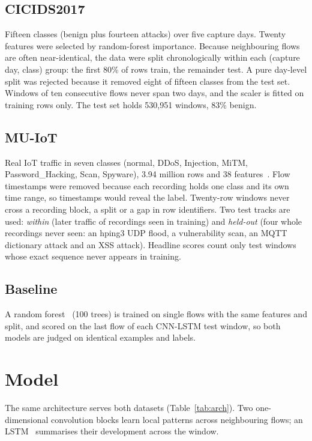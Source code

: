 \documentclass[conference]{IEEEtran}
\begin{document}
\subsection{CICIDS2017}
Fifteen classes (benign plus fourteen attacks) over five capture days.
Twenty features were selected by random-forest importance. Because
neighbouring flows are often near-identical, the data were split
chronologically within each (capture day, class) group: the first 80\% of
rows train, the remainder test. A pure day-level split was rejected because
it removed eight of fifteen classes from the test set. Windows of ten
consecutive flows never span two days, and the scaler is fitted on training
rows only. The test set holds 530{,}951 windows, 83\% benign.

\subsection{MU-IoT}
Real IoT traffic in seven classes (normal, DDoS, Injection, MiTM,
Password\_Hacking, Scan, Spyware), 3.94 million rows and 38
features~\cite{ref8}. Flow timestamps were removed because each recording
holds one class and its own time range, so timestamps would reveal the label.
Twenty-row windows never cross a recording block, a split or a gap in row
identifiers. Two test tracks are used: \emph{within} (later traffic of
recordings seen in training) and \emph{held-out} (four whole recordings never
seen: an hping3 UDP flood, a vulnerability scan, an MQTT dictionary attack
and an XSS attack). Headline scores count only test windows whose exact
sequence never appears in training.

\subsection{Baseline}
A random forest~\cite{ref10} (100 trees) is trained on single flows with the
same features and split, and scored on the last flow of each CNN-LSTM test
window, so both models are judged on identical examples and labels.

\section{Model}

The same architecture serves both datasets (Table~\ref{tab:arch}). Two
one-dimensional convolution blocks learn local patterns across neighbouring
flows; an LSTM~\cite{ref9} summarises their development across the window.
\end{document}
